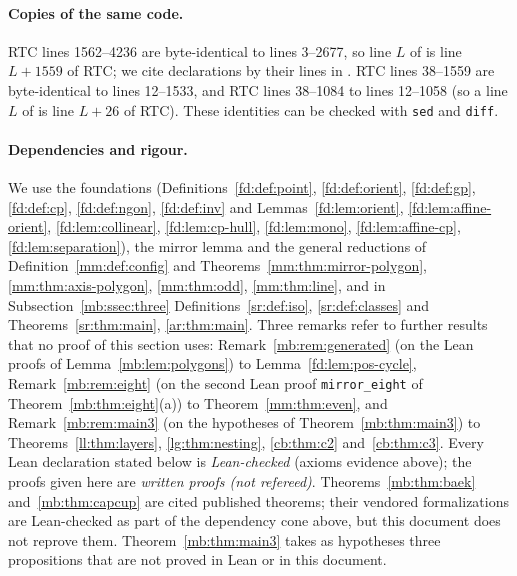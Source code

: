 \paragraph{Copies of the same code.}
RTC lines 1562--4236 are byte-identical to  lines 3--2677, so line $L$ of
 is line $L+1559$ of RTC; we cite  declarations by their lines in
. RTC lines 38--1559 are byte-identical to  lines 12--1533, and
RTC lines 38--1084 to  lines 12--1058 (so a line $L$ of
 is line $L+26$ of RTC). These identities can be checked with \texttt{sed} and \texttt{diff}.

\paragraph{Dependencies and rigour.}
We use the foundations (Definitions~\ref{fd:def:point}, \ref{fd:def:orient}, \ref{fd:def:gp}, \ref{fd:def:cp},
\ref{fd:def:ngon}, \ref{fd:def:inv} and Lemmas~\ref{fd:lem:orient}, \ref{fd:lem:affine-orient}, \ref{fd:lem:collinear},
\ref{fd:lem:cp-hull}, \ref{fd:lem:mono}, \ref{fd:lem:affine-cp}, \ref{fd:lem:separation}), the mirror lemma and the
general reductions of Definition~\ref{mm:def:config} and Theorems~\ref{mm:thm:mirror-polygon},
\ref{mm:thm:axis-polygon}, \ref{mm:thm:odd}, \ref{mm:thm:line}, and in
Subsection~\ref{mb:ssec:three} Definitions~\ref{sr:def:iso}, \ref{sr:def:classes} and Theorems~\ref{sr:thm:main},
\ref{ar:thm:main}. Three remarks refer to further results that no proof of this section uses:
Remark~\ref{mb:rem:generated} (on the Lean proofs of Lemma~\ref{mb:lem:polygons}) to Lemma~\ref{fd:lem:pos-cycle},
Remark~\ref{mb:rem:eight} (on the second Lean proof \texttt{mirror\_eight\textquotesingle} of
Theorem~\ref{mb:thm:eight}(a)) to Theorem~\ref{mm:thm:even},
and Remark~\ref{mb:rem:main3} (on the hypotheses of Theorem~\ref{mb:thm:main3}) to Theorems~\ref{ll:thm:layers},
\ref{lg:thm:nesting}, \ref{cb:thm:c2} and~\ref{cb:thm:c3}. Every Lean declaration stated below is
\emph{Lean-checked} (axioms evidence above); the proofs given here are \emph{written proofs (not refereed)}.
Theorems~\ref{mb:thm:baek} and~\ref{mb:thm:capcup} are cited published theorems; their vendored formalizations are
Lean-checked as part of the dependency cone above, but this document does not reprove them. Theorem~\ref{mb:thm:main3}
takes as hypotheses three propositions that are not proved in Lean or in this document.

